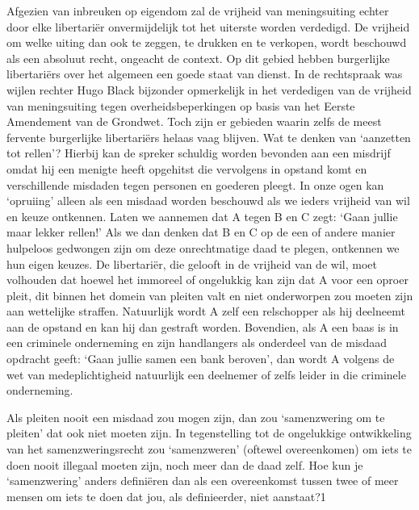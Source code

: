 \documentclass[
  a5paper,
  smalldemyvopaper,10pt,twoside,onecolumn,openright,extrafontsizes,hidelinks]{memoir}
\begin{document}
Afgezien van inbreuken op eigendom zal de vrijheid van meningsuiting
echter door elke libertariër onvermijdelijk tot het uiterste worden
verdedigd. De vrijheid om welke uiting dan ook te zeggen, te drukken en
te verkopen, wordt beschouwd als een absoluut recht, ongeacht de
context. Op dit gebied hebben burgerlijke libertariërs over het algemeen
een goede staat van dienst. In de rechtspraak was wijlen rechter Hugo
Black bijzonder opmerkelijk in het verdedigen van de vrijheid van
meningsuiting tegen overheidsbeperkingen op basis van het Eerste
Amendement van de Grondwet. Toch zijn er gebieden waarin zelfs de meest
fervente burgerlijke libertariërs helaas vaag blijven. Wat te denken van
`aanzetten tot rellen'? Hierbij kan de spreker schuldig worden bevonden
aan een misdrijf omdat hij een menigte heeft opgehitst die vervolgens in
opstand komt en verschillende misdaden tegen personen en goederen
pleegt. In onze ogen kan `opruiing' alleen als een misdaad worden
beschouwd als we ieders vrijheid van wil en keuze ontkennen. Laten we
aannemen dat A tegen B en C zegt: `Gaan jullie maar lekker rellen!' Als
we dan denken dat B en C op de een of andere manier hulpeloos gedwongen
zijn om deze onrechtmatige daad te plegen, ontkennen we hun eigen
keuzes. De libertariër, die gelooft in de vrijheid van de wil, moet
volhouden dat hoewel het immoreel of ongelukkig kan zijn dat A voor een
oproer pleit, dit binnen het domein van pleiten valt en niet onderworpen
zou moeten zijn aan wettelijke straffen. Natuurlijk wordt A zelf een
relschopper als hij deelneemt aan de opstand en kan hij dan gestraft
worden. Bovendien, als A een baas is in een criminele onderneming en
zijn handlangers als onderdeel van de misdaad opdracht geeft: `Gaan
jullie samen een bank beroven', dan wordt A volgens de wet van
medeplichtigheid natuurlijk een deelnemer of zelfs leider in die
criminele onderneming.

Als pleiten nooit een misdaad zou mogen zijn, dan zou `samenzwering om
te pleiten' dat ook niet moeten zijn. In tegenstelling tot de
ongelukkige ontwikkeling van het samenzweringsrecht zou `samenzweren'
(oftewel overeenkomen) om iets te doen nooit illegaal moeten zijn, noch
meer dan de daad zelf. Hoe kun je `samenzwering' anders definiëren dan
als een overeenkomst tussen twee of meer mensen om iets te doen dat jou,
als definieerder, niet aanstaat?1
\end{document}
